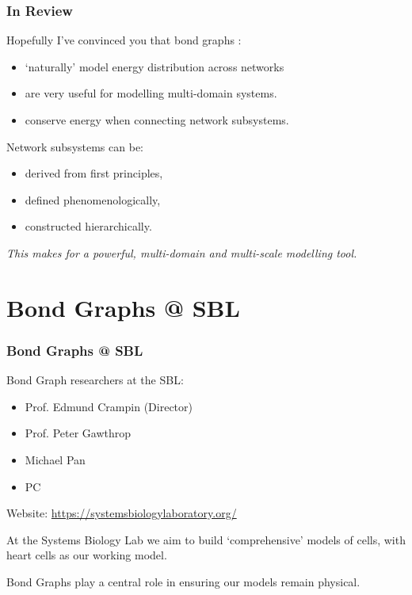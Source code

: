 \documentclass[11pt,reqno]{beamer}
\begin{document}
\begin{frame}
\frametitle{In Review}
Hopefully I've convinced you that bond graphs :
\begin{itemize}
	\item `naturally' model energy distribution across networks
	\item are very useful for modelling multi-domain systems.
	\item conserve energy when connecting network subsystems.
\end{itemize}
\vspace{22pt}

Network subsystems can be:
\begin{itemize}
	\item derived from first principles,
	\item defined phenomenologically, 
	\item constructed hierarchically.
\end{itemize}
\emph{This makes for a powerful, multi-domain and multi-scale modelling tool.}
\end{frame}
\section{Bond Graphs @ SBL}
\begin{frame}
\frametitle{Bond Graphs @ SBL}
Bond Graph researchers at the SBL:
\begin{itemize}
	\item Prof. Edmund Crampin (Director)
	\item Prof. Peter Gawthrop
	\item Michael Pan
	\item PC
\end{itemize}
\begin{small}

Website: \url{https://systemsbiologylaboratory.org/}\\
	\vspace{10pt}
	
At the Systems Biology Lab we aim to build `comprehensive' models of cells, with heart cells as our working model.\\
\vspace{10pt}

Bond Graphs play a central role in ensuring our models remain physical.
\end{small}
\end{frame}
\end{document}
